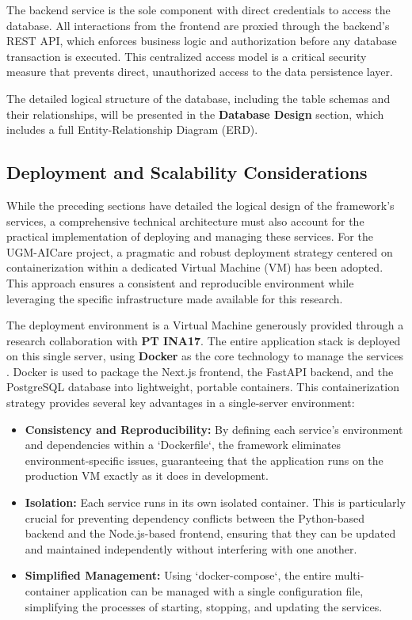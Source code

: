 The backend service is the sole component with direct credentials to access the database. All interactions from the frontend are proxied through the backend's REST API, which enforces business logic and authorization before any database transaction is executed. This centralized access model is a critical security measure that prevents direct, unauthorized access to the data persistence layer.

The detailed logical structure of the database, including the table schemas and their relationships, will be presented in the \textbf{Database Design} section, which includes a full Entity-Relationship Diagram (ERD).

\subsection{Deployment and Scalability Considerations}

While the preceding sections have detailed the logical design of the framework's services, a comprehensive technical architecture must also account for the practical implementation of deploying and managing these services. For the UGM-AICare project, a pragmatic and robust deployment strategy centered on containerization within a dedicated Virtual Machine (VM) has been adopted. This approach ensures a consistent and reproducible environment while leveraging the specific infrastructure made available for this research.

The deployment environment is a Virtual Machine generously provided through a research collaboration with \textbf{PT INA17}. The entire application stack is deployed on this single server, using \textbf{Docker} as the core technology to manage the services \cite{FIND_CITATION_HERE}. Docker is used to package the Next.js frontend, the FastAPI backend, and the PostgreSQL database into lightweight, portable containers. This containerization strategy provides several key advantages in a single-server environment:
\begin{itemize}
    \item \textbf{Consistency and Reproducibility:} By defining each service's environment and dependencies within a `Dockerfile`, the framework eliminates environment-specific issues, guaranteeing that the application runs on the production VM exactly as it does in development.
    \item \textbf{Isolation:} Each service runs in its own isolated container. This is particularly crucial for preventing dependency conflicts between the Python-based backend and the Node.js-based frontend, ensuring that they can be updated and maintained independently without interfering with one another.
    \item \textbf{Simplified Management:} Using `docker-compose`, the entire multi-container application can be managed with a single configuration file, simplifying the processes of starting, stopping, and updating the services.
\end{itemize}

